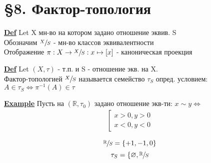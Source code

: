 \documentclass[a4paper]{article}
\begin{document}
\section*{\centering \S 8. Фактор-топология}

\begin{tcolorbox}
\textbf{\underline{Def}} Let X мн-во на котором задано отношение эквив. S\\
Обозначим $ \sfrac{X}{S} $  - мн-во классов эквивалентности\\
Отображение $ \pi: X \to \sfrac{X}{S}: x \mapsto [x] $ - каноническая проекция
\end{tcolorbox}

\begin{tcolorbox}
\textbf{\underline{Def}} Let $ (X,\tau) $ - т.п. и S - отношение экв. на X.\\
Фактор-топологией $ \sfrac{X}{S} $ называется семейство $ \tau_S $ опред. условием:\\
$ A \in \tau_S \iff \pi^{-1}(A) \in \tau $ 
\end{tcolorbox}

\textbf{\underline{Example}} Пусть на $ (\mathbb{R}, \tau_0) $ задано отношение экв-ти:
    $ x \sim y \iff $ \begin{align*}
    \left[
    \begin{array}{ll}
        x > 0, y > 0 \\
        x < 0, y < 0
    \end{array}
    \right .
    \end{align*}

\[
    \sfrac{\mathbb{R}}{S} = \{ +1, -1, 0 \}  
\]
\[
    \tau_S = \{ \varnothing, \sfrac{\mathbb{R}}{S}
\]
\end{document}
